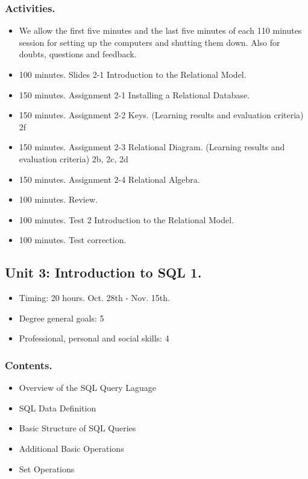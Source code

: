 \documentclass[catalan, a4paper, 12pt, titlepage]{article}
\begin{document}
  \subsubsection{Activities.}

  \begin{itemize}
          \item We allow the first five minutes and the last five minutes of each 110 minutes session for setting up the computers and shutting them down. Also for doubts, questions and feedback.
          \item 100 minutes. Slides 2-1 Introduction to the Relational Model.
	  \item 150 minutes. Assignment 2-1 Installing a Relational Database.
	  \item 150 minutes. Assignment 2-2 Keys. (\faGraduationCap Learning results and evaluation criteria) 2f
	  \item 150 minutes. Assignment 2-3 Relational Diagram. (\faGraduationCap Learning results and evaluation criteria) 2b, 2c, 2d
	  \item 150 minutes. Assignment 2-4 Relational Algebra.
	  \item 100 minutes. Review.
	  \item 100 minutes. Test 2 Introduction to the Relational Model.
	  \item 100 minutes. Test correction.
  \end{itemize}

  \subsection{Unit 3: Introduction to SQL 1.}

  \begin{itemize}
	\item Timing: 20 hours. Oct. 28th - Nov. 15th.
	\item Degree general goals: 5
	\item Professional, personal and social skills: 4
  \end{itemize}

  \subsubsection{Contents.}
  \begin{itemize}
	  \item Overview of the SQL Query Laguage
	  \item SQL Data Definition
	  \item Basic Structure of SQL Queries
	  \item Additional Basic Operations
	  \item Set Operations
  \end{itemize}
\end{document}
